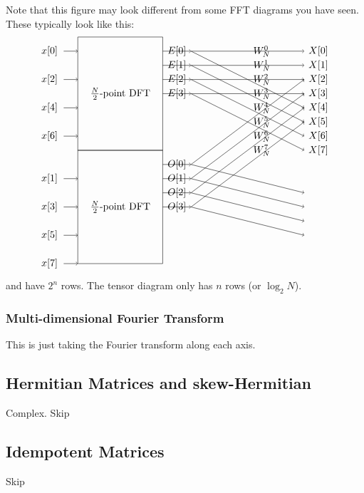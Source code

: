 \documentclass[oneside]{book}
\begin{document}
Note that this figure may look different from some FFT diagrams you have seen.
These typically look like this:
\[
\begin{tikzpicture}
  \draw (0, 1) rectangle (3, 5) node[midway] {$\frac{N}{2}$-point DFT};
  \draw (0, -3) rectangle (3, 1) node[midway] {$\frac{N}{2}$-point DFT};

  \foreach \i in {0,2,4,6} {
    \node at (-1, 4.5 - \i*0.5) {$x[\i]$};
    \draw[->] (-0.5, 4.5 - \i*0.5) -- (0, 4.5 - \i*0.5);
  }
  
  \foreach \i in {1,3,5,7} {
    \node at (-1, 4.5 - \i*0.5 - 4) {$x[\i]$};
    \draw[->] (-0.5, 4.5 - \i*0.5 - 4) -- (0, 4.5 - \i*0.5 - 4);
  }

  \foreach \i in {0,1,2,3} {
    \node at (3.5, 4.5 - \i*0.5) {$E[\i]$};
    \draw[->] (3, 4.5 - \i*0.5) -- (4, 4.5 - \i*0.5);
  }
  
  \foreach \i in {0,1,2,3} {
    \node at (3.5, 4.5 - \i*0.5 - 4) {$O[\i]$};
    \draw[->] (3, 4.5 - \i*0.5 - 4) -- (4, 4.5 - \i*0.5 - 4);
  }

  \foreach \i in {0,...,7} {
    \node at (8.5, 4.5 - \i*0.5) {$X[\i]$};
  }
  
  \foreach \i in {0,...,7} {
    \node at (6.5, 4.5 - \i*0.5) {$W_N^{\i}$};
  }

  \foreach \i in {0,...,3} {
    \draw[->] (4, 4.5 - \i*0.5) -- (8, 4.5 - \i*0.5);
    \draw[->] (4, 4.5 - \i*0.5) -- (8, 4.5 - \i*0.5 - 2);
  }
  
  \foreach \i in {0,...,3} {
    \draw[->] (4, 4.5 - \i*0.5 - 4) -- (8, 4.5 - \i*0.5 - 1);
    \draw[->] (4, 4.5 - \i*0.5 - 4) -- (8, 4.5 - \i*0.5 - 5);
  }
\end{tikzpicture}
\]
and have $2^n$ rows.
The tensor diagram only has $n$ rows (or $\log_2 N$).

\subsubsection{Multi-dimensional Fourier Transform}
This is just taking the Fourier transform along each axis.

\newpage


\subsection{Hermitian Matrices and skew-Hermitian}
Complex. Skip
\subsection{Idempotent Matrices}
Skip
\end{document}
